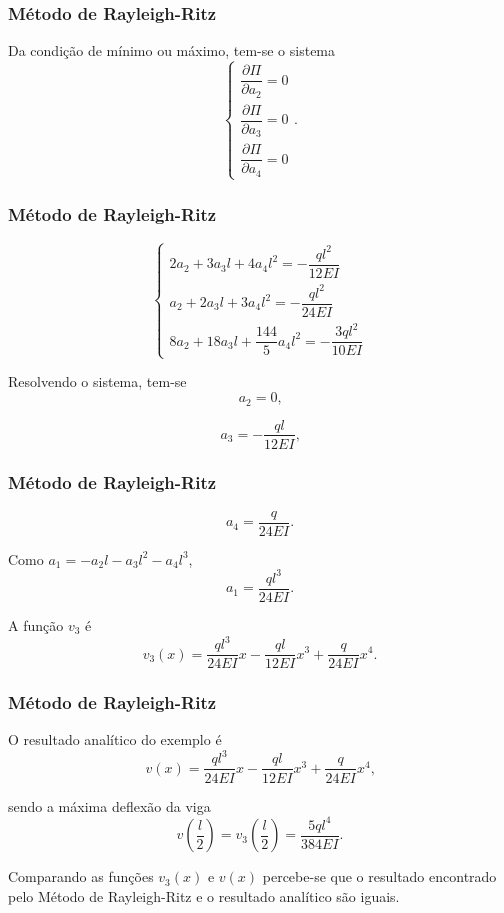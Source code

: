 \documentclass{beamer}
\newif\ifcompilepause
\newcommand{\cpause}{
	\ifcompilepause
	\pause
	\fi
}
\begin{document}
	\begin{frame}
		\frametitle{Método de Rayleigh-Ritz}
		\justify
		Da condição de mínimo ou máximo, tem-se o sistema
		$$
			\begin{cases}
				\dfrac{\partial \Pi}{\partial a_2}=0\\[10pt]
				\dfrac{\partial \Pi}{\partial a_3}=0\\[10pt]
				\dfrac{\partial \Pi}{\partial a_4}=0
			\end{cases}
			\text{.}
		$$
	\end{frame}
	
	\begin{frame}
		\frametitle{Método de Rayleigh-Ritz}
		\justify
		
		$$
			\begin{cases}
				2a_2 + 3a_3l + 4a_4l^2 = -\dfrac{ql^2}{12EI}\\[10pt]
				a_2 + 2a_3 l + 3a_4 l^2 = - \dfrac{ql^2}{24EI}\\[10pt]
				8a_2 + 18a_3 l + \dfrac{144}{5} a_4 l^2 =-\dfrac{3ql^2}{10EI}
			\end{cases}
		$$
		\cpause
		Resolvendo o sistema, tem-se
		$$
			a_2 = 0
			\text{,}
		$$
		\cpause
		$$
			a_3 = -\frac{ql}{12EI}
			\text{,}
		$$
	\end{frame}
	
	\begin{frame}
		\frametitle{Método de Rayleigh-Ritz}
		\justify
	
		$$
			a_4 = \frac{q}{24EI}
			\text{.}
		$$
		\cpause
		Como $a_1=-a_2l - a_3l^2-a_4l^3$,
		$$
			a_1 = \frac{ql^3}{24EI}
			\text{.}
		$$
		\cpause
		A função $v_3$ é
		$$
			v_3(x)=
			\frac{ql^3}{24EI} x
			-
			\frac{ql}{12EI} x^3
			+
			\frac{q}{24EI} x^4
			\text{.}
		$$
	\end{frame}
	
	\begin{frame}
		\frametitle{Método de Rayleigh-Ritz}
		\justify
		
		O resultado analítico do exemplo é
		$$
			v(x)=\frac{ql^3}{24EI}x - \frac{ql}{12EI}x^3 + \frac{q}{24EI}x^4
			\text{,}
		$$
		\cpause
		sendo a máxima deflexão da viga
		$$
			v\left (\frac{l}{2}\right )
			=
			v_3\left (\frac{l}{2}\right )
			= \frac{5ql^4}{384EI}
			\text{.}
		$$
		\cpause
		
		Comparando as funções $v_3(x)$ e $v(x)$ percebe-se que o resultado encontrado pelo Método de Rayleigh-Ritz e o resultado analítico são iguais.
	\end{frame}
	
\end{document}
